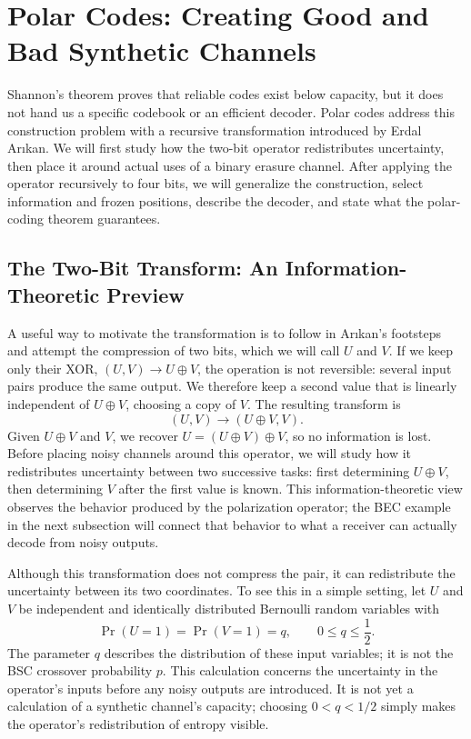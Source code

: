 \section{Polar Codes: Creating Good and Bad Synthetic Channels}

Shannon's theorem proves that reliable codes exist below capacity, but it does not hand us a specific codebook or an efficient decoder. Polar codes address this construction problem with a recursive transformation introduced by Erdal Arıkan. We will first study how the two-bit operator redistributes uncertainty, then place it around actual uses of a binary erasure channel. After applying the operator recursively to four bits, we will generalize the construction, select information and frozen positions, describe the decoder, and state what the polar-coding theorem guarantees.

\subsection{The Two-Bit Transform: An Information-Theoretic Preview}
\label{subsec:polar-core-idea}

A useful way to motivate the transformation is to follow in Arıkan's footsteps and attempt the compression of two bits, which we will call $U$ and $V$. If we keep only their XOR, $(U,V)\to U\oplus V$, the operation is not reversible: several input pairs produce the same output. We therefore keep a second value that is linearly independent of $U\oplus V$, choosing a copy of $V$. The resulting transform is
\begin{equation}
(U,V)\longrightarrow(U\oplus V,V).
\label{eq:polar-transform}
\end{equation}
Given $U\oplus V$ and $V$, we recover $U=(U\oplus V)\oplus V$, so no information is lost. Before placing noisy channels around this operator, we will study how it redistributes uncertainty between two successive tasks: first determining $U\oplus V$, then determining $V$ after the first value is known. This information-theoretic view observes the behavior produced by the polarization operator; the BEC example in the next subsection will connect that behavior to what a receiver can actually decode from noisy outputs.

Although this transformation does not compress the pair, it can redistribute the uncertainty between its two coordinates. To see this in a simple setting, let $U$ and $V$ be independent and identically distributed Bernoulli random variables with
\begin{equation}
\Pr(U=1)=\Pr(V=1)=q,
\qquad 0\leq q\leq\frac12.
\label{eq:polar-bernoulli-inputs}
\end{equation}
The parameter $q$ describes the distribution of these input variables; it is not the BSC crossover probability $p$.
This calculation concerns the uncertainty in the operator's inputs before any noisy outputs are introduced. It is not yet a calculation of a synthetic channel's capacity; choosing $0<q<1/2$ simply makes the operator's redistribution of entropy visible.


